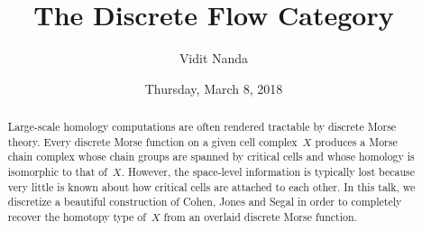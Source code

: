 \documentclass{UAmathtalk}
\author{Vidit Nanda}
\title{The Discrete Flow Category}
\date{Thursday, March 8, 2018}
\begin{document}
\maketitle

\begin{abstract}
Large-scale homology computations are often rendered tractable by discrete Morse theory. Every discrete Morse function on a given cell complex~$X$ produces a Morse chain complex whose chain groups are spanned by critical cells and whose homology is isomorphic to that of~$X$. However, the space-level information is typically lost because very little is known about how critical cells are attached to each other. In this talk, we discretize a beautiful construction of Cohen, Jones and Segal in order to completely recover the homotopy type of~$X$ from an overlaid discrete Morse function.
\end{abstract}
\end{document}
